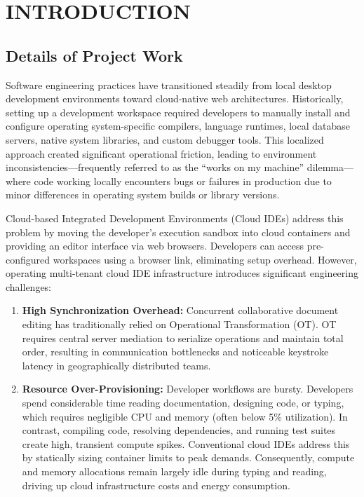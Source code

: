 \documentclass[12pt,a4paper]{report}
\begin{document}
	\clearpage
	\tableofcontents
	
	\clearpage
	\listoffigures
	
	\clearpage
	\listoftables
	
	\clearpage
	\setcounter{page}{1}
	
	\chapter{INTRODUCTION}
	
	\section{Details of Project Work}
	Software engineering practices have transitioned steadily from local desktop development environments toward cloud-native web architectures. Historically, setting up a development workspace required developers to manually install and configure operating system-specific compilers, language runtimes, local database servers, native system libraries, and custom debugger tools. This localized approach created significant operational friction, leading to environment inconsistencies---frequently referred to as the ``works on my machine'' dilemma---where code working locally encounters bugs or failures in production due to minor differences in operating system builds or library versions.
	
	Cloud-based Integrated Development Environments (Cloud IDEs) address this problem by moving the developer's execution sandbox into cloud containers and providing an editor interface via web browsers. Developers can access pre-configured workspaces using a browser link, eliminating setup overhead. However, operating multi-tenant cloud IDE infrastructure introduces significant engineering challenges:
	\begin{enumerate}
		\item \textbf{High Synchronization Overhead:} Concurrent collaborative document editing has traditionally relied on Operational Transformation (OT). OT requires central server mediation to serialize operations and maintain total order, resulting in communication bottlenecks and noticeable keystroke latency in geographically distributed teams.
		\item \textbf{Resource Over-Provisioning:} Developer workflows are bursty. Developers spend considerable time reading documentation, designing code, or typing, which requires negligible CPU and memory (often below 5\% utilization). In contrast, compiling code, resolving dependencies, and running test suites create high, transient compute spikes. Conventional cloud IDEs address this by statically sizing container limits to peak demands. Consequently, compute and memory allocations remain largely idle during typing and reading, driving up cloud infrastructure costs and energy consumption.
	\end{enumerate}
	
\end{document}
